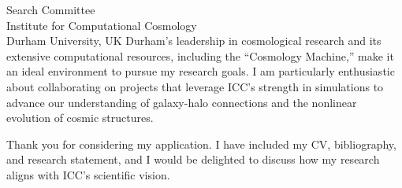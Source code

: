 \documentclass[10pt]{letter}
\begin{document}
\begin{letter}{Search Committee \\ Institute for Computational Cosmology \\ Durham University, UK}
Durham’s leadership in cosmological research and its extensive computational resources, including the “Cosmology Machine,” make it an ideal environment to pursue my research goals. I am particularly enthusiastic about collaborating on projects that leverage ICC’s strength in simulations to advance our understanding of galaxy-halo connections and the nonlinear evolution of cosmic structures.
    
Thank you for considering my application. I have included my CV, bibliography, and research statement, and I would be delighted to discuss how my research aligns with ICC’s scientific vision.

\end{letter}
\end{document}
